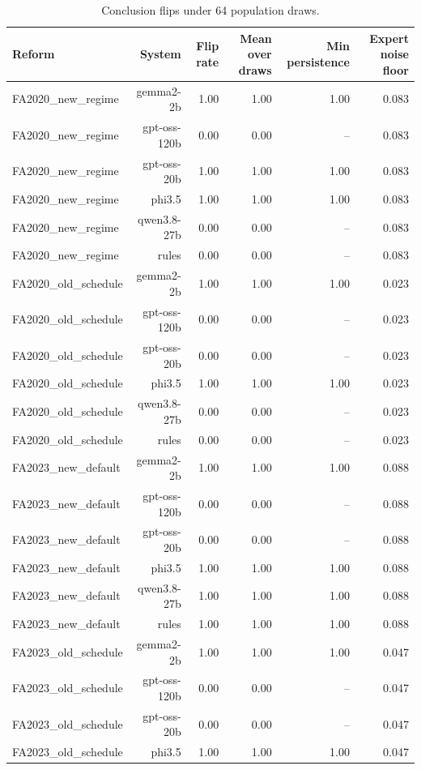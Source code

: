 \begin{table}[t]
\centering\small
\caption{Conclusion flips under 64 population draws.}
\label{tab:robustness}
\begin{tabular}{lrrrrr}
\toprule
Reform & System & Flip rate & Mean over draws & Min persistence & Expert noise floor \\
\midrule
FA2020\_new\_regime & gemma2-2b & 1.00 & 1.00 & 1.00 & 0.083 \\
FA2020\_new\_regime & gpt-oss-120b & 0.00 & 0.00 & -- & 0.083 \\
FA2020\_new\_regime & gpt-oss-20b & 1.00 & 1.00 & 1.00 & 0.083 \\
FA2020\_new\_regime & phi3.5 & 1.00 & 1.00 & 1.00 & 0.083 \\
FA2020\_new\_regime & qwen3.8-27b & 0.00 & 0.00 & -- & 0.083 \\
FA2020\_new\_regime & rules & 0.00 & 0.00 & -- & 0.083 \\
FA2020\_old\_schedule & gemma2-2b & 1.00 & 1.00 & 1.00 & 0.023 \\
FA2020\_old\_schedule & gpt-oss-120b & 0.00 & 0.00 & -- & 0.023 \\
FA2020\_old\_schedule & gpt-oss-20b & 0.00 & 0.00 & -- & 0.023 \\
FA2020\_old\_schedule & phi3.5 & 1.00 & 1.00 & 1.00 & 0.023 \\
FA2020\_old\_schedule & qwen3.8-27b & 0.00 & 0.00 & -- & 0.023 \\
FA2020\_old\_schedule & rules & 0.00 & 0.00 & -- & 0.023 \\
FA2023\_new\_default & gemma2-2b & 1.00 & 1.00 & 1.00 & 0.088 \\
FA2023\_new\_default & gpt-oss-120b & 0.00 & 0.00 & -- & 0.088 \\
FA2023\_new\_default & gpt-oss-20b & 0.00 & 0.00 & -- & 0.088 \\
FA2023\_new\_default & phi3.5 & 1.00 & 1.00 & 1.00 & 0.088 \\
FA2023\_new\_default & qwen3.8-27b & 1.00 & 1.00 & 1.00 & 0.088 \\
FA2023\_new\_default & rules & 1.00 & 1.00 & 1.00 & 0.088 \\
FA2023\_old\_schedule & gemma2-2b & 1.00 & 1.00 & 1.00 & 0.047 \\
FA2023\_old\_schedule & gpt-oss-120b & 0.00 & 0.00 & -- & 0.047 \\
FA2023\_old\_schedule & gpt-oss-20b & 0.00 & 0.00 & -- & 0.047 \\
FA2023\_old\_schedule & phi3.5 & 1.00 & 1.00 & 1.00 & 0.047 \\

\end{tabular}
\end{table}
